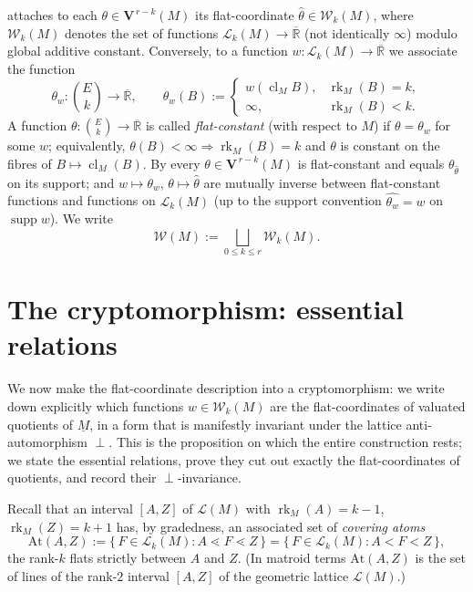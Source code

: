 \documentclass{article}
\theoremstyle{definition}
\newcommand{\Rbar}{\overline{\mathbb{R}}}
\newcommand{\rk}{\operatorname{rk}}
\newcommand{\cl}{\operatorname{cl}}
\newcommand{\bV}{\mathbf V}
\newcommand{\cLL}{\mathcal{L}}
\newcommand{\cW}{\mathcal{W}}
\begin{document}
 attaches to each $\theta\in\bV^{\,r-k}(M)$ its flat-coordinate
$\widehat\theta\in\cW_k(M)$, where $\cW_k(M)$ denotes the set of functions
$\cLL_k(M)\to\Rbar$ (not identically $\infty$) modulo global additive constant. Conversely, to a
function $w\colon\cLL_k(M)\to\Rbar$ we associate the function
\begin{equation}\label{eqn:thetaw}
  \theta_w\colon\binom{E}{k}\to\Rbar,\qquad
  \theta_w(B):=\begin{cases}w(\cl_M B), & \rk_M(B)=k,\\ \infty, & \rk_M(B)<k.\end{cases}
\end{equation}
A function $\theta\colon\binom{E}{k}\to\Rbar$ is called \emph{flat-constant} (with respect to $M$) if
$\theta=\theta_w$ for some $w$; equivalently, $\theta(B)<\infty\Rightarrow\rk_M(B)=k$ and $\theta$
is constant on the fibres of $B\mapsto\cl_M(B)$. By  every
$\theta\in\bV^{\,r-k}(M)$ is flat-constant and equals $\theta_{\widehat\theta}$ on its support; and
$w\mapsto\theta_w$, $\theta\mapsto\widehat\theta$ are mutually inverse between flat-constant
functions and functions on $\cLL_k(M)$ (up to the support convention $\widehat{\theta_w}=w$ on
$\operatorname{supp}w$). We write
\[
  \cW(M):=\bigsqcup_{0\le k\le r}\cW_k(M).
\]

\section{The cryptomorphism: essential relations}\label{sec:crypto}

We now make the flat-coordinate description into a cryptomorphism: we write down explicitly which
functions $w\in\cW_k(M)$ are the flat-coordinates of valuated quotients of $\underline M$, in a form
that is manifestly invariant under the lattice anti-automorphism $\perp$. This is the proposition on
which the entire construction rests; we state the essential relations, prove they cut out exactly the
flat-coordinates of quotients, and record their $\perp$-invariance.

Recall that an interval $[A,Z]$ of $\cLL(M)$ with $\rk_M(A)=k-1$, $\rk_M(Z)=k+1$ has, by gradedness,
an associated set of \emph{covering atoms}
\[
  \mathrm{At}(A,Z):=\{\,F\in\cLL_k(M):A\lessdot F\lessdot Z\,\}
  =\{\,F\in\cLL_k(M):A<F<Z\,\},
\]
the rank-$k$ flats strictly between $A$ and $Z$. (In matroid terms $\mathrm{At}(A,Z)$ is the set of
lines of the rank-$2$ interval $[A,Z]$ of the geometric lattice $\cLL(M)$.)
\end{document}
